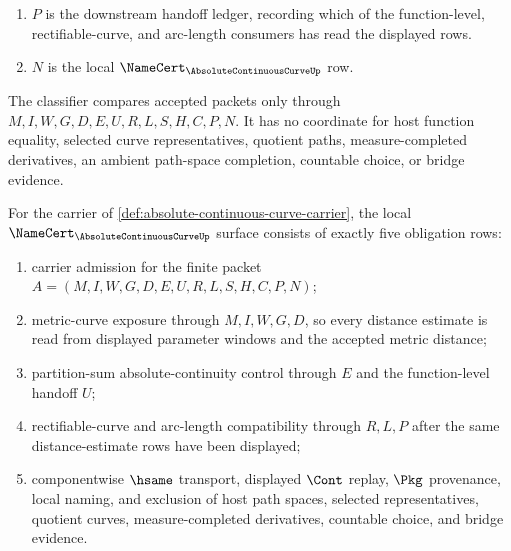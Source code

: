 \begin{definition}
\begin{enumerate}
\item $P$ is the downstream handoff ledger, recording which of the function-level, rectifiable-curve, and arc-length consumers has read the displayed rows.
\item $N$ is the local $\NameCert_{\AbsoluteContinuousCurveUp}$ row.
\end{enumerate}
The classifier compares accepted packets only through $M,I,W,G,D,E,U,R,L,S,H,C,P,N$. It has no coordinate for host function equality, selected curve representatives, quotient paths, measure-completed derivatives, an ambient path-space completion, countable choice, or bridge evidence.
\end{definition}

\begin{theorem}
\label{thm:absolute-continuous-curve-namecert-obligations}
For the carrier of \autoref{def:absolute-continuous-curve-carrier}, the local $\NameCert_{\AbsoluteContinuousCurveUp}$ surface consists of exactly five obligation rows:
\begin{enumerate}
\item carrier admission for the finite packet $A=(M,I,W,G,D,E,U,R,L,S,H,C,P,N)$;
\item metric-curve exposure through $M,I,W,G,D$, so every distance estimate is read from displayed parameter windows and the accepted metric distance;
\item partition-sum absolute-continuity control through $E$ and the function-level handoff $U$;
\item rectifiable-curve and arc-length compatibility through $R,L,P$ after the same distance-estimate rows have been displayed;
\item componentwise $\hsame$ transport, displayed $\Cont$ replay, $\Pkg$ provenance, local naming, and exclusion of host path spaces, selected representatives, quotient curves, measure-completed derivatives, countable choice, and bridge evidence.
\end{enumerate}
\end{theorem}
